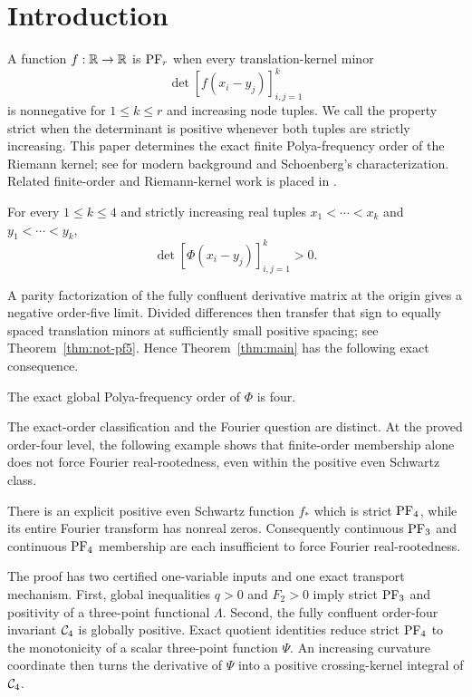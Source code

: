 \section{Introduction}\label{sec:introduction}

A function \(f:\mathbb{R}\to\mathbb{R}\) is \(\mathrm{PF}_r\) when every translation-kernel minor
\[
 \det[f(x_i-y_j)]_{i,j=1}^k
\]
is nonnegative for \(1\leq k\leq r\) and increasing node tuples. We call the
property strict when the determinant is positive whenever both tuples are
strictly increasing. This paper determines the exact finite Polya-frequency
order of the Riemann kernel; see \cite{belton} for modern background and
Schoenberg's characterization. Related finite-order and Riemann-kernel work is
placed in .

\begin{theorem}\label{thm:main}
For every \(1\leq k\leq4\) and strictly increasing real tuples
\(x_1<\cdots<x_k\) and \(y_1<\cdots<y_k\),
\[
 \det[\Phi(x_i-y_j)]_{i,j=1}^k>0.
\]
\end{theorem}

A parity factorization of the fully confluent derivative matrix at the origin
gives a negative order-five limit. Divided differences then transfer that sign
to equally spaced translation minors at sufficiently small positive spacing;
see Theorem~\ref{thm:not-pf5}. Hence Theorem~\ref{thm:main} has the following
exact consequence.

\begin{corollary}\label{cor:exact-order}
The exact global Polya-frequency order of \(\Phi\) is four.
\end{corollary}

The exact-order classification and the Fourier question are distinct. At the
proved order-four level, the following example shows that finite-order
membership alone does not force Fourier real-rootedness, even within the
positive even Schwartz class.

\begin{theorem}\label{thm:separator}
There is an explicit positive even Schwartz function \(f_*\) which is strict
\(\mathrm{PF}_4\), while its entire Fourier transform has nonreal zeros.
Consequently continuous \(\mathrm{PF}_3\) and continuous \(\mathrm{PF}_4\) membership are
each insufficient to force Fourier real-rootedness.
\end{theorem}

The proof has two certified one-variable inputs and one exact transport
mechanism. First, global inequalities \(q>0\) and \(F_2>0\) imply strict
\(\mathrm{PF}_3\) and positivity of a three-point functional \(\Lambda\). Second, the
fully confluent order-four invariant \(\mathcal{C}_4\) is globally positive. Exact
quotient identities reduce strict \(\mathrm{PF}_4\) to the monotonicity of a scalar
three-point function \(\Psi\). An increasing curvature coordinate then turns
the derivative of \(\Psi\) into a positive crossing-kernel integral of
\(\mathcal{C}_4\).

